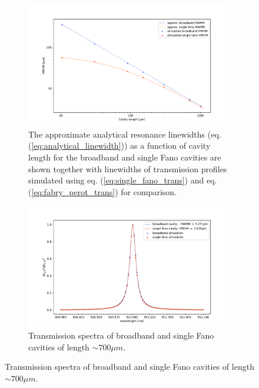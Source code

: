 \begin{figure}
    \centering
    \begin{subfigure}[c]{0.64\textwidth}
        \centering
        \includegraphics[width=\textwidth]{figures/HWHM_broadband_vs_single_sim.pdf}
        \caption{The approximate analytical resonance linewidths (eq. (\ref{eq:analytical_linewidth})) as a function of cavity length for the broadband and single Fano cavities are shown together with linewidths of transmission profiles simulated using eq. (\ref{eq:single_fano_trans}) and eq. (\ref{eq:fabry_perot_trans}) for comparison.}
        \label{fig:HWHM_broadband_vs_single_fano}
    \end{subfigure}
    \begin{subfigure}[c]{0.34\textwidth}
        \includegraphics[width=\textwidth]{figures/sim_single_vs_broadband_700um.pdf}
        \caption{Transmission spectra of broadband and single Fano cavities of length $\sim 700 \mu m$.}
        \label{fig:700um_broadband_and_single_fano_peak}

\end{subfigure}
\end{figure}
